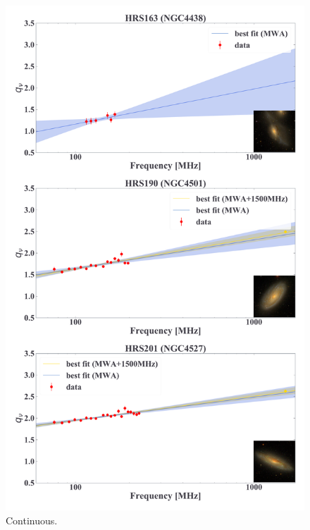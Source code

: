 \documentclass[12pt,a4paper,twoside,openright,final,titlepage]{report}
\begin{document}
\begin{figure}[htbp]
    \centering
    \includegraphics[width=.85\linewidth]{Figures/AppendixC_qfitting4.pdf}
    \caption[Fitting results for 18 samples (4)]{\label{fig:fittingresults4}
        Continuous.
    }
\end{figure}
\end{document}
